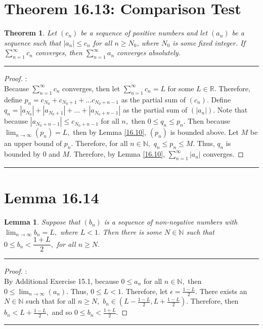 \documentclass[openany, amssymb, psamsfonts]{amsart}
\newcommand{\bbN}{\mathbb{N}}
\newcommand{\bbR}{\mathbb{R}}
\newcommand{\abs}[1]{\lvert #1 \rvert}
\newtheorem{thm}{Theorem}[section]
\newtheorem{lem}{Lemma}[section]
\theoremstyle{definition}
\numberwithin{equation}{section}
\begin{document}
\section*{Theorem 16.13: Comparison Test}
\begin{thm}
\label{16.13}
	Let $(c_n)$ be a sequence of positive numbers and let $(a_n)$ be a sequence such that $\abs{a_n} \leq c_n$ for all $n \geq N_0$, where $N_0$ is some fixed integer.
	If $\sum\limits_{n = 1}^{\infty} c_n$ converges, then $\sum\limits_{n = 1}^{\infty} a_n$ converges absolutely. 
\end{thm}
\vspace{4pt}     \hrule   \vspace{4pt}\begin{proof}:\\
    Because $\displaystyle\sum_{n =1}^\infty c_n$ converges, then let $\displaystyle\sum_{n =1}^\infty c_n = L$ for some $L \in \bbR.$ Therefore, define $p_n = c_{N_0} + c_{N_0+1} + \dots c_{N_0 +n -1}$ as the partial sum of $(c_n).$ Define $q_n = |a_{N_0}| + |a_{N_0+1}| + \dots + |a_{N_0 + n -1}|$ as the partial sum of $(|a_n|).$ Note that because $|a_{N_0 + n -1}|\leq c_{N_0 + n -1}$ for all $n,$ then $0\leq q_n \leq p_n.$ Then because $\displaystyle\lim_{n\to \infty}(p_n) = L,$ then by Lemma \ref{16.10}, $(p_n)$ is bounded above. Let $M$ be an upper bound of $p_n.$ Therefore, for all $n\in \bbN,$ $q_n \leq p_n \leq M.$ Thus, $q_n$ is bounded by $0$ and $M$. Therefore, by Lemma \ref{16.10}, $\sum\limits_{n = 1}^{\infty} |a_n|$ converges. 
\end{proof}\vspace{4pt}     \hrule   \vspace{4pt}

\section*{Lemma 16.14}
\begin{lem}
\label{16.14}
Suppose that $(b_n)$ is a sequence of non-negative numbers with $\displaystyle \lim_{n\longrightarrow \infty} b_n=L,$ where $L<1.$ 
Then there is some $N\in\bbN$ such that $0\leq b_n <\dfrac{1+L}{2},$ for all $n\geq N.$
 \end{lem}
\vspace{4pt}     \hrule   \vspace{4pt}\begin{proof}:\\
    By Additional Exercise 15.1, because $0\leq a_n$ for all $n\in \bbN,$ then $0\leq \displaystyle\lim_{n\to\infty}(a_n).$ Thus, $0\leq L < 1.$ Therefore, let $\epsilon = \frac{1-L}{2}.$ There exists an $N \in \bbN$ such that for all $n\geq N,$ $b_n \in (L- \frac{1-L}{2}, L + \frac{1-L}{2}).$ Therefore, then $b_n < L + \frac{1-L}{2},$ and so $0\leq b_n < \frac{1 + L}{2}.$
\end{proof}\vspace{4pt}     \hrule   \vspace{4pt}
\end{document}
